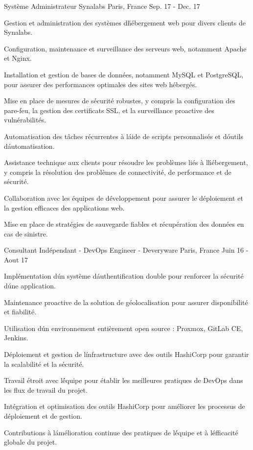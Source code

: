 \begin{cventries}
\cventry
{Système Administrateur} %
{Synalabs} %
{Paris, France} %
{Sep. 17 - Dec. 17 } %
{
  \begin{cvitems} %
    \item {Gestion et administration des systèmes d\' hébergement web pour divers clients de Synalabs.}
    \item {Configuration, maintenance et surveillance des serveurs web, notamment Apache et Nginx.}
    \item {Installation et gestion de bases de données, notamment MySQL et PostgreSQL, pour assurer des performances optimales des sites web hébergés.}
    \item {Mise en place de mesures de sécurité robustes, y compris la configuration des pare-feu, la gestion des certificats SSL, et la surveillance proactive des vulnérabilités.}
    \item {Automatisation des tâches récurrentes à l\' aide de scripts personnalisés et d\' outils d\' automatisation.}
    \item {Assistance technique aux clients pour résoudre les problèmes liés à l\' hébergement, y compris la résolution des problèmes de connectivité, de performance et de sécurité.}
    \item {Collaboration avec les équipes de développement pour assurer le déploiement et la gestion efficaces des applications web.}
    \item {Mise en place de stratégies de sauvegarde fiables et récupération des données en cas de sinistre.}
  \end{cvitems}
}

\cventry
{Consultant Indépendant - DevOps Engineer -} %
{Deveryware} %
{Paris, France} %
{Juin 16 - Aout 17} %
{
  \begin{cvitems} %
    \item {Implémentation d\' un système d\' authentification double pour renforcer la sécurité d\' une application.}
    \item {Maintenance proactive de la solution de géolocalisation pour assurer disponibilité et fiabilité.}
    \item {Utilisation d\' un environnement entièrement open source : Proxmox, GitLab CE, Jenkins.}
    \item {Déploiement et gestion de l\' infrastructure avec des outils HashiCorp pour garantir la scalabilité et la sécurité.}
    \item {Travail étroit avec l\' équipe pour établir les meilleures pratiques de DevOps dans les flux de travail du projet.}
    \item {Intégration et optimisation des outils HashiCorp pour améliorer les processus de déploiement et de gestion.}
    \item {Contributions à l\' amélioration continue des pratiques de l\' équipe et à l\' efficacité globale du projet.}
  \end{cvitems}
}


\end{cventries}

